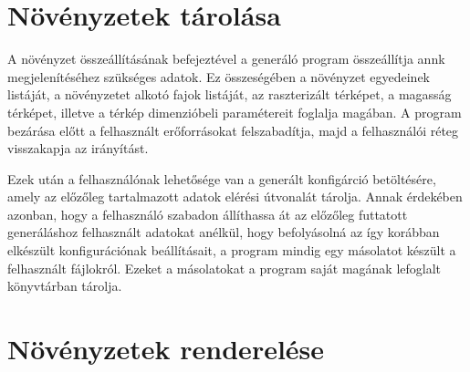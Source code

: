 



\pagebreak
\section{Növényzetek tárolása}
A növényzet összeállításának befejeztével a generáló program összeállítja annk megjelenítéséhez szükséges adatok. Ez összeségében a növényzet egyedeinek listáját, a növényzetet alkotó fajok listáját, az raszterizált térképet, a magasság térképet, illetve a térkép dimenzióbeli paramétereit foglalja magában. A program bezárása előtt a felhasznált erőforrásokat felszabadítja, majd a felhasználói réteg visszakapja az irányítást.

Ezek után a felhasználónak lehetősége van a generált konfigárció betöltésére, amely az előzőleg  tartalmazott adatok elérési útvonalát tárolja. Annak érdekében azonban, hogy a felhasználó szabadon állíthassa át az előzőleg futtatott generáláshoz felhasznált adatokat anélkül, hogy befolyásolná az így korábban elkészült konfigurációnak beállításait, a program mindig egy másolatot készült a felhasznált fájlokról. Ezeket a másolatokat a program saját magának lefoglalt könyvtárban tárolja.

\section{Növényzetek renderelése}

